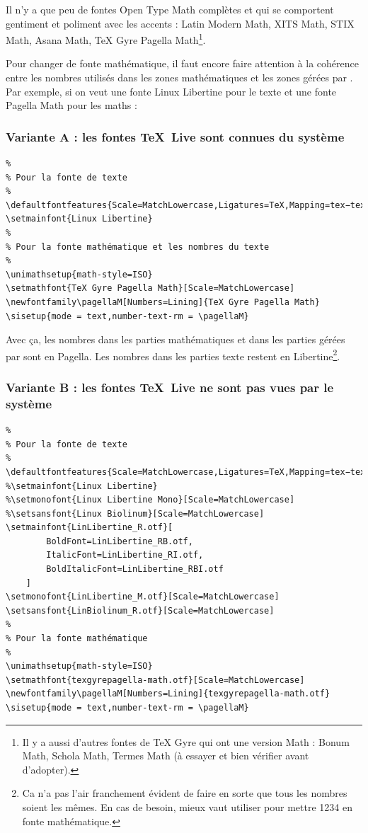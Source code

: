 Il n'y a que peu de fontes Open Type Math complètes et qui se comportent gentiment et poliment avec les accents : Latin Modern Math, XITS Math, STIX Math, Asana Math, TeX Gyre Pagella Math\footnote{Il y a aussi d'autres fontes de TeX Gyre qui ont une version Math : Bonum Math, Schola Math, Termes Math (à essayer et bien vérifier avant d'adopter).}.

Pour changer de fonte mathématique, il faut encore faire attention à la cohérence entre les nombres utilisés dans les zones mathématiques et les zones gérées par . Par exemple, si on veut une fonte Linux Libertine pour le texte et une fonte Pagella Math pour les maths :


\subsubsection{Variante A : les fontes \TeX \ Live sont connues du système}
\begin{verbatim}
%
% Pour la fonte de texte
%
\defaultfontfeatures{Scale=MatchLowercase,Ligatures=TeX,Mapping=tex−text}
\setmainfont{Linux Libertine}
%
% Pour la fonte mathématique et les nombres du texte
%
\unimathsetup{math-style=ISO}
\setmathfont{TeX Gyre Pagella Math}[Scale=MatchLowercase]
\newfontfamily\pagellaM[Numbers=Lining]{TeX Gyre Pagella Math}
\sisetup{mode = text,number-text-rm = \pagellaM}
\end{verbatim}

Avec ça, les nombres dans les parties mathématiques et dans les parties gérées par  sont en Pagella. Les nombres dans les parties texte restent en Libertine\footnote{Ca n'a pas l'air franchement évident de faire en sorte que tous les nombres soient les mêmes. En cas de besoin, mieux vaut utiliser  pour mettre 1234 en fonte mathématique.}.


\subsubsection{Variante B : les fontes \TeX \ Live ne sont pas vues par le système}
\begin{verbatim}
%
% Pour la fonte de texte
%
\defaultfontfeatures{Scale=MatchLowercase,Ligatures=TeX,Mapping=tex−text}
%\setmainfont{Linux Libertine}
%\setmonofont{Linux Libertine Mono}[Scale=MatchLowercase]
%\setsansfont{Linux Biolinum}[Scale=MatchLowercase]
\setmainfont{LinLibertine_R.otf}[
		BoldFont=LinLibertine_RB.otf,
		ItalicFont=LinLibertine_RI.otf,
		BoldItalicFont=LinLibertine_RBI.otf	
	]
\setmonofont{LinLibertine_M.otf}[Scale=MatchLowercase]
\setsansfont{LinBiolinum_R.otf}[Scale=MatchLowercase]
%
% Pour la fonte mathématique
%
\unimathsetup{math-style=ISO}
\setmathfont{texgyrepagella-math.otf}[Scale=MatchLowercase]
\newfontfamily\pagellaM[Numbers=Lining]{texgyrepagella-math.otf}
\sisetup{mode = text,number-text-rm = \pagellaM}
\end{verbatim}


